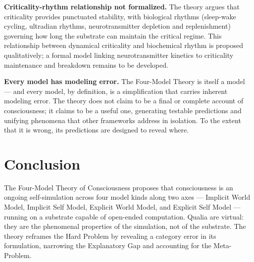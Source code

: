 \documentclass[12pt]{article}
\begin{document}
\textbf{Criticality-rhythm relationship not formalized.} The theory argues that criticality provides punctuated stability, with biological rhythms (sleep-wake cycling, ultradian rhythms, neurotransmitter depletion and replenishment) governing how long the substrate can maintain the critical regime. This relationship between dynamical criticality and biochemical rhythm is proposed qualitatively; a formal model linking neurotransmitter kinetics to criticality maintenance and breakdown remains to be developed.

\textbf{Every model has modeling error.} The Four-Model Theory is itself a model --- and every model, by definition, is a simplification that carries inherent modeling error. The theory does not claim to be a final or complete account of consciousness; it claims to be a useful one, generating testable predictions and unifying phenomena that other frameworks address in isolation. To the extent that it is wrong, its predictions are designed to reveal where.



\section{Conclusion}


The Four-Model Theory of Consciousness proposes that consciousness is an ongoing self-simulation across four model kinds along two axes --- Implicit World Model, Implicit Self Model, Explicit World Model, and Explicit Self Model --- running on a substrate capable of open-ended computation. Qualia are virtual: they are the phenomenal properties of the simulation, not of the substrate. The theory reframes the Hard Problem by revealing a category error in its formulation, narrowing the Explanatory Gap and accounting for the Meta-Problem.
\end{document}
